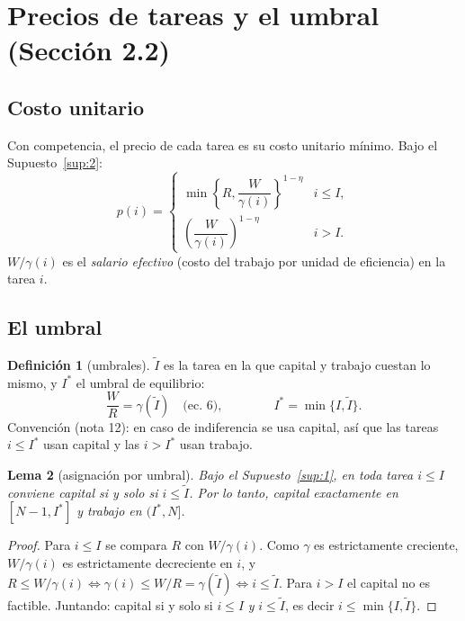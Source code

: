 \documentclass[11pt,a4paper]{article}
\theoremstyle{definition}
\newtheorem{definicion}{Definición}[section]
\theoremstyle{plain}
\newtheorem{lema}[definicion]{Lema}
\theoremstyle{remark}
\numberwithin{equation}{section}
\newcommand{\It}{\tilde I}
\newcommand{\Is}{I^{*}}
\begin{document}
\section{Precios de tareas y el umbral (Sección 2.2)}

\subsection{Costo unitario}
Con competencia, el precio de cada tarea es su costo unitario mínimo. Bajo el Supuesto~\ref{sup:2}:
\begin{equation}\label{eq:p}
  p(i)=\begin{cases}\min\left\{R,\dfrac{W}{\gamma(i)}\right\}^{1-\eta} & i\le I,\\[8pt]
  \left(\dfrac{W}{\gamma(i)}\right)^{1-\eta} & i>I.\end{cases} \tag{ec.~5}
\end{equation}
$W/\gamma(i)$ es el \emph{salario efectivo} (costo del trabajo por unidad de eficiencia) en la tarea $i$.

\subsection{El umbral}
\begin{definicion}[umbrales]
$\It$ es la tarea en la que capital y trabajo cuestan lo mismo, y $\Is$ el umbral de equilibrio:
\[
  \frac{W}{R}=\gamma(\It) \quad\text{(ec.~6)},\qquad\qquad \Is=\min\{I,\It\}.
\]
Convención (nota 12): en caso de indiferencia se usa capital, así que las tareas $i\le \Is$ usan capital y las
$i>\Is$ usan trabajo.
\end{definicion}

\begin{lema}[asignación por umbral]\label{lem:umbral}
Bajo el Supuesto~\ref{sup:1}, en toda tarea $i\le I$ conviene capital si y solo si $i\le\It$. Por lo tanto, capital
exactamente en $[N-1,\Is]$ y trabajo en $(\Is,N]$.
\end{lema}
\begin{proof}
Para $i\le I$ se compara $R$ con $W/\gamma(i)$. Como $\gamma$ es estrictamente creciente, $W/\gamma(i)$ es
estrictamente decreciente en $i$, y $R\le W/\gamma(i)\iff\gamma(i)\le W/R=\gamma(\It)\iff i\le\It$. Para $i>I$ el
capital no es factible. Juntando: capital si y solo si $i\le I$ \emph{y} $i\le\It$, es decir $i\le\min\{I,\It\}$.
\end{proof}
\end{document}
